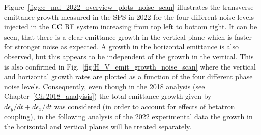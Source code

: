 Figure~\ref{fig:cc_md_2022_overview_plots_noise_scan} illustrates the transverse emittance growth measured in the SPS in 2022 for the four different noise levels injected in the ${\mathrm{CC}}$ RF system increasing from top left to bottom right. It can be seen, that there is a clear emittance growth in the vertical plane which is faster for stronger noise as expected. A growth in the horizontal emittance is also observed, but this appears to be independent of the growth in the vertical. This is also confirmed in Fig.~\ref{fig:H_V_emit_growth_noise_scan} where the vertical and horizontal growth rates are plotted as a function of the four different phase noise levels. Consequently, even though in the 2018 analysis (see Chapter~\ref{Ch:2018_analyisis}) the total emittance growth given by $d\epsilon_y/dt +d\epsilon_x/dt $ was considered (in order to account for effects of betatron coupling), in the following analysis of the 2022 experimental data the growth in the horizontal and vertical planes will be treated separately.


